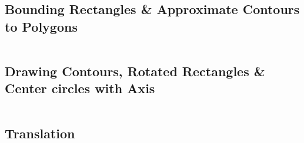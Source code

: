 \documentclass[a4paper, 10pt]{article}
\begin{document}

\subsection{Bounding Rectangles \& Approximate Contours to Polygons}


\begin{lstlisting}[language = C++]

\end{lstlisting}


\subsection{Drawing Contours, Rotated Rectangles \& Center circles with Axis}


\begin{lstlisting}[language = C++]

\end{lstlisting}


\subsection{Translation}

\end{document}

